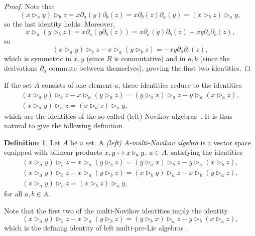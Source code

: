 \documentclass[10pt,a4paper]{article}
\theoremstyle{definition}
\newtheorem{defi}[theo]{Definition}
\numberwithin{equation}{section}
\numberwithin{figure}{section}
\let\oldmapsto\mapsto
\renewcommand*{\mapsto}{\mathchoice{\longmapsto}{\oldmapsto}{\oldmapsto}{\oldmapsto}}
\begin{document}
\begin{proof}
Note that
\[
(x \triangleright_a y) \triangleright_b z=x\partial_a(y)\partial_b(z)=x\partial_b(z)\partial_a(y)=(x \triangleright_b z)\triangleright_a y,
\]
so the last identity holds. Moreover,
\[
x \triangleright_a (y \triangleright_b z)=x\partial_a(y\partial_b(z))=x\partial_a(y)\partial_b(z)+xy\partial_a\partial_b(z),
\]
so
\[
(x \triangleright_a y) \triangleright_b z - x \triangleright_a (y \triangleright_b z)= -xy\partial_a\partial_b(z),
\]
which is symmetric in $x,y$ (since $R$ is commutative) and in $a,b$ (since the derivations $\partial_a$ commute between themselves), proving the first two identities.
\end{proof}

If the set $A$ consists of one element $a$, these identities reduce to the identities
\begin{gather*}
(x \triangleright_a y) \triangleright_a z - x \triangleright_a (y \triangleright_a z) = (y \triangleright_a x) \triangleright_a z - y \triangleright_a (x \triangleright_a z),
\\ (x \triangleright_a y) \triangleright_a z = (x \triangleright_a z)\triangleright_a y,
\end{gather*}
which are the identities of the so-called (left) Novikov algebras~\cite{BN85,DL,O92}. It is thus natural to give the following definition.

\begin{defi}\label{def_multi_novikov}
Let $A$ be a set. A \emph{(left) $A$-multi-Novikov algebra} is a vector space equipped with bilinear products $x,y\mapsto x\triangleright_a y$, $a\in A$, satisfying the identities
\begin{gather}
(x \triangleright_a y) \triangleright_b z - x \triangleright_a (y \triangleright_b z) = (y \triangleright_a x) \triangleright_b z - y \triangleright_a (x \triangleright_b z)\label{eq:exchgen}
,
\\ (x \triangleright_a y) \triangleright_b z - x \triangleright_a (y \triangleright_b z) = (x\triangleright_b y) \triangleright_a z - x \triangleright_b (y \triangleright_a z)\label{eq:exchA}
,
\\ (x \triangleright_a y) \triangleright_b z = (x \triangleright_b z)\triangleright_a y\label{eq:rcom}
,
\end{gather}
for all $ a,b\in A$.
\end{defi}

Note that the first two of the multi-Novikov identities imply the identity
\[
(x \triangleright_a y) \triangleright_b z - x \triangleright_a (y \triangleright_b z) = (y \triangleright_b x) \triangleright_a z - y \triangleright_b (x \triangleright_a z),
\]
which is the defining identity of left multi-pre-Lie algebras~\cite[Proposition~4.21]{BCCH}.
\end{document}
